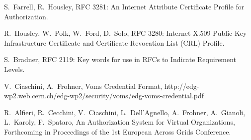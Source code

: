 \documentclass[a4]{article}
\begin{document}
\begin{thebibliography}{rfc3280}
S.~Farrell, R.~Housley, RFC 3281: An Internet Attribute Certificate
  Profile for Authorization.

R.~Housley, W.~Polk, W.~Ford, D.~Solo, RFC 3280: Internet X.509 Public
  Key Infrastructure Certificate and Certificate Revocation List (CRL)
  Profile.

S.~Bradner, RFC 2119: Key words for use in RFCs to Indicate
  Requirement Levels.

V.~Ciaschini, A.~Frohner, Voms Credential Format,
http://edg-wp2.web.cern.ch/edg-wp2/security/voms/edg-voms-credential.pdf

R.~Alfieri, R.~Cecchini, V.~Ciaschini, L.~Dell'Agnello, A.~Frohner,
  A.~Gianoli, L.~Karoly, F.~Spataro, An Authorization System for
  Virtual Organizations, Forthcoming in Proceedings of the 1st
  European Across Grids Conference.
\end{thebibliography}
\end{document}
